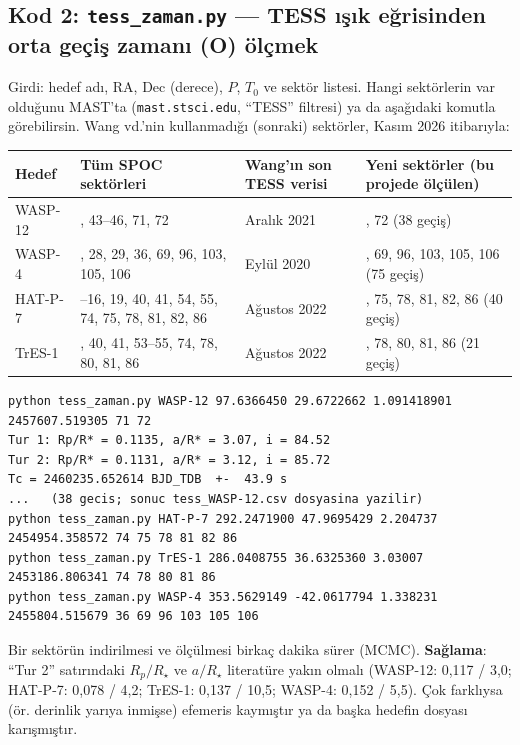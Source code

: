 \subsection{Kod 2: \texttt{tess\_zaman.py} — TESS ışık eğrisinden orta geçiş zamanı (O) ölçmek}
Girdi: hedef adı, RA, Dec (derece), $P$, $T_0$ ve sektör listesi. Hangi sektörlerin var olduğunu MAST'ta
(\texttt{mast.stsci.edu}, “TESS” filtresi) ya da aşağıdaki komutla görebilirsin. Wang vd.'nin kullanmadığı
(sonraki) sektörler, Kasım 2026 itibarıyla:

\begin{center}
\small
\begin{tabularx}{\textwidth}{l >{\raggedright\arraybackslash}X l >{\raggedright\arraybackslash}X}
\toprule
Hedef & Tüm SPOC sektörleri & Wang'ın son TESS verisi & Yeni sektörler (bu projede ölçülen)\\
\midrule
WASP-12 & 20, 43–46, 71, 72 & Aralık 2021 & 71, 72 (38 geçiş)\\
WASP-4  & 2, 28, 29, 36, 69, 96, 103, 105, 106 & Eylül 2020 & 36, 69, 96, 103, 105, 106 (75 geçiş)\\
HAT-P-7 & 14–16, 19, 40, 41, 54, 55, 74, 75, 78, 81, 82, 86 & Ağustos 2022 & 74, 75, 78, 81, 82, 86 (40 geçiş)\\
TrES-1  & 14, 40, 41, 53–55, 74, 78, 80, 81, 86 & Ağustos 2022 & 74, 78, 80, 81, 86 (21 geçiş)\\
\bottomrule
\end{tabularx}
\end{center}


\begin{lstlisting}[style=kabuk]
python tess_zaman.py WASP-12 97.6366450 29.6722662 1.091418901 2457607.519305 71 72
Tur 1: Rp/R* = 0.1135, a/R* = 3.07, i = 84.52
Tur 2: Rp/R* = 0.1131, a/R* = 3.12, i = 85.72
Tc = 2460235.652614 BJD_TDB  +-  43.9 s
...   (38 gecis; sonuc tess_WASP-12.csv dosyasina yazilir)
python tess_zaman.py HAT-P-7 292.2471900 47.9695429 2.204737 2454954.358572 74 75 78 81 82 86
python tess_zaman.py TrES-1 286.0408755 36.6325360 3.03007 2453186.806341 74 78 80 81 86
python tess_zaman.py WASP-4 353.5629149 -42.0617794 1.338231 2455804.515679 36 69 96 103 105 106
\end{lstlisting}
Bir sektörün indirilmesi ve ölçülmesi birkaç dakika sürer (MCMC). \textbf{Sağlama}: “Tur 2” satırındaki $R_p/R_\star$ ve
$a/R_\star$ literatüre yakın olmalı (WASP-12: 0,117 / 3,0; HAT-P-7: 0,078 / 4,2; TrES-1: 0,137 / 10,5; WASP-4: 0,152 / 5,5).
Çok farklıysa (ör. derinlik yarıya inmişse) efemeris kaymıştır ya da başka hedefin dosyası karışmıştır.

